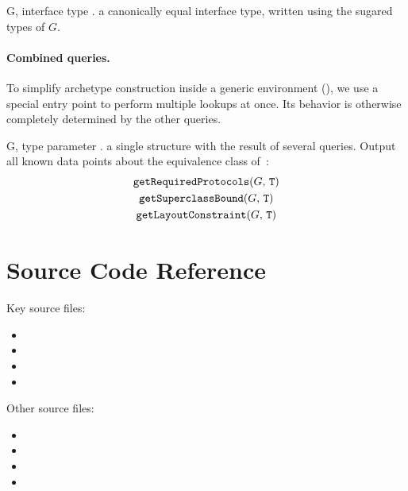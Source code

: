 \documentclass[../generics]{subfiles}
\begin{document}
\begin{itemize}
{G, \tT}
{interface type \tT.}
{a canonically equal interface type, written using the sugared types of $G$.}
{}
\end{itemize}

\paragraph{Combined queries.} To simplify archetype construction inside a generic environment (), we use a special entry point to perform multiple lookups at once. Its behavior is otherwise completely determined by the other queries.

\begin{itemize}
{G, \tT}
{type parameter \tT.}
{a single structure with the result of several queries.}
{Output all known data points about the equivalence class of~\tT:
\begin{gather*}
\texttt{getRequiredProtocols}(G,\,\texttt{T})\\
\texttt{getSuperclassBound}(G,\,\texttt{T})\\
\texttt{getLayoutConstraint}(G,\,\texttt{T})
\end{gather*}}
\end{itemize}

\section{Source Code Reference}\label{genericsigsourceref}

Key source files:
\begin{itemize}
\item {}
\item {}
\item {}
\item {}
\end{itemize}
Other source files:
\begin{itemize}
\item {}
\item {}
\item {}
\item {}
\end{itemize}
\end{document}
